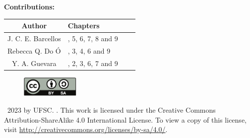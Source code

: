 \begin{center}
\textbf{Contributions:}

\begin{table}[!ht]
    \centering
    \begin{tabular}{cL{5cm}L{5.5cm}C{2cm}}
        \toprule[1.5pt]
        \textbf{Author} & \quad\quad\quad \textbf{Chapters}\\
        \midrule
        J. C. E. Barcellos & \quad{}, 5, 6, 7, 8 and 9\\
        Rebecca Q. Do Ó    & \quad{}, 3, 4, 6 and 9\\
        Y. A. Guevara      & \quad{}, 2, 3, 6, 7 and 9\\
        \bottomrule[1.5pt]
    \end{tabular}
\end{table}
\end{center}

\vspace{1cm}

\begin{figure}[!h]
	\begin{center}
		\includegraphics[width=0.25\textwidth]{by-sa.pdf}
	\end{center}
\end{figure}

\textcopyright\  2023 by UFSC. \thetitle. This work is licensed under the Creative Commons Attribution-ShareAlike 4.0 International License. To view a copy of this license, visit \href{http://creativecommons.org/licenses/by-sa/4.0/}{http://creativecommons.org/licenses/by-sa/4.0/}.


